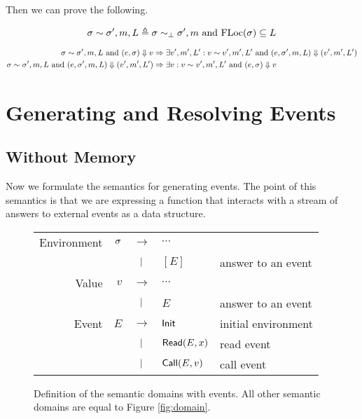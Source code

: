 \documentclass{article}
\begin{document}
Then we can prove the following.

\begin{definition}
  \[\sigma\sim\sigma',m,L\triangleq\sigma\sim_\bot\sigma',m\text{ and }\text{FLoc}(\sigma)\subseteq L\]
\end{definition}

\begin{thm}
  \begin{align*}
    \sigma\sim\sigma',m,L\text{ and }(e,\sigma)\Downarrow v                    & \Rightarrow\exists v',m',L':v\sim v',m',L'\text{ and }(e,\sigma',m,L)\Downarrow(v',m',L') \\
    \sigma\sim\sigma',m,L\text{ and }(e,\sigma',m,L)\Downarrow(v',m',L') & \Rightarrow\exists v:v\sim v',m',L'\text{ and }(e,\sigma)\Downarrow v
  \end{align*}
\end{thm}

\section{Generating and Resolving Events}

\subsection{Without Memory}
Now we formulate the semantics for generating events.
The point of this semantics is that we are expressing a function that interacts with a stream of answers to external events as a data structure.

\begin{figure}[h!]
  \centering
  \begin{tabular}{rrcll}
    Environment & $\sigma$ & $\rightarrow$ & $\cdots$                            \\
                &        & $|$       & $[E]$         & answer to an event  \\
    Value       & $v$    & $\rightarrow$ & $\cdots$                            \\
                &        & $|$       & $E$           & answer to an event  \\
    Event       & $E$    & $\rightarrow$ & $\textsf{Init}$      & initial environment \\
                &        & $|$       & $\textsf{Read}(E,x)$ & read event          \\
                &        & $|$       & $\textsf{Call}(E,v)$ & call event
  \end{tabular}
  \caption{Definition of the semantic domains with events. All other semantic domains are equal to Figure \ref{fig:domain}.}
  \label{fig:eventdomain}
\end{figure}
\end{document}
